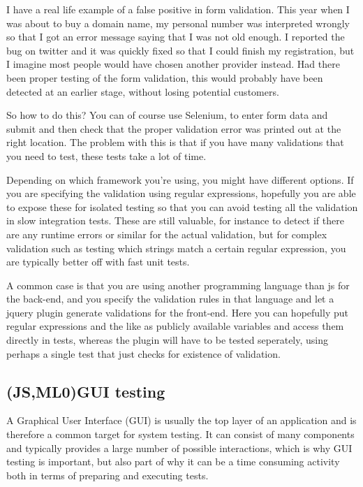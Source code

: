 \documentclass[11pt]{article}
\begin{document}
I have a real life example of a false positive in form validation. This year when I was about to buy a domain name, my personal number was interpreted wrongly so that I got an error message saying that I was not old enough. I reported the bug on twitter and it was quickly fixed so that I could finish my registration, but I imagine most people would have chosen another provider instead. Had there been proper testing of the form validation, this would probably have been detected at an earlier stage, without losing potential customers. \cite{TwitterMe}

So how to do this? You can of course use Selenium, to enter form data and submit and then check that the proper validation error was printed out at the right location. The problem with this is that if you have many validations that you need to test, these tests take a lot of time.

Depending on which framework you're using, you might have different options. If you are specifying the validation using regular expressions, hopefully you are able to expose these for isolated testing so that you can avoid testing all the validation in slow integration tests. These are still valuable, for instance to detect if there are any runtime errors or similar for the actual validation, but for complex validation such as testing which strings match a certain regular expression, you are typically better off with fast unit tests.

A common case is that you are using another programming language than \gls{js} for the back-end, and you specify the validation rules in that language and let a jquery plugin generate validations for the front-end. Here you can hopefully put regular expressions and the like as publicly available variables and access them directly in tests, whereas the plugin will have to be tested seperately, using perhaps a single test that just checks for existence of validation.

\subsection{(JS,ML0)GUI testing}

A Graphical User Interface (GUI) is usually the top layer of an application and is therefore a common target for system testing. It can consist of many components and typically provides a large number of possible interactions, which is why GUI testing is important, but also part of why it can be a time consuming activity both in terms of preparing and executing tests.
\end{document}
